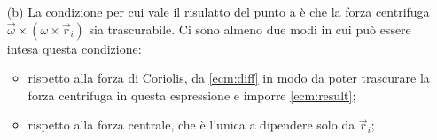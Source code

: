 \documentclass[../main.tex]{subfiles}
\begin{document}
\begin{itemize}
    \begin{equation}
    \label{ecm:result}
    \vec \omega=\frac{e}{2mc} \vec B
    \end{equation}
    e $m \vec \omega \times (\omega \times \vec r_i)$ deve essere trascurabile (rispetto a cosa non \`e chiaro, vedi punto b).
    
    \item[(b)]
    La condizione per cui vale il risulatto del punto a \`e che la forza centrifuga  $\vec \omega \times (\omega \times \vec r_i)$ sia trascurabile.
    Ci sono almeno due modi in cui pu\`o essere intesa questa condizione:
    
    \begin{itemize}
      \item rispetto alla forza di Coriolis, da \cref{ecm:diff} in modo da poter trascurare la forza centrifuga in questa espressione e imporre \cref{ecm:result};
      \item rispetto alla forza centrale, che \`e l'unica a dipendere solo da $\vec r_i$;
    \end{itemize}
    
    
  \end{itemize}
\end{document}
